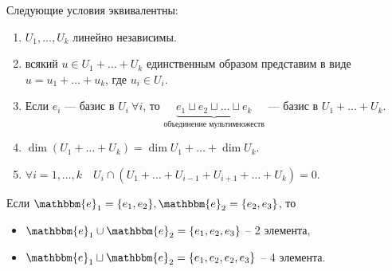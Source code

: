 \begin{theorem}
    Следующие условия эквивалентны:
    \begin{enumerate}[label=(\arabic*)]
    \item \label{lec15:eq_thm_1} $U_1, \dots, U_k$ линейно независимы.
    \item \label{lec15:eq_thm_2} всякий $u \in U_1 + \dots + U_k$ единственным образом представим в виде $u = u_1 + \dots + u_k$, где $u_i \in U_i$.
    \item \label{lec15:eq_thm_3} Если $e_i$ --- базис в $U_i \ \forall i$, то $\underbrace{e_1 \sqcup e_2 \sqcup \dots \sqcup e_k}_\text{объединение мультимножеств}$ --- базис в $U_1 + \dots + U_k$.
    \item \label{lec15:eq_thm_4} $\dim (U_1 + \dots + U_k) = \dim U_1 + \dots + \dim U_k$.
    \item \label{lec15:eq_thm_5} $\forall i = 1, \dots, k \quad U_i \cap (U_1 + \dots + U_{i - 1} + U_{i + 1} + \dots + U_k) = 0$.
    \end{enumerate}
\end{theorem}

\begin{example}
    \newcommand{\E}{\mathbbm{e}}
    Если $\E_1 = \{e_1, e_2\}, \E_2 = \{e_2, e_3\}$, то
    \begin{itemize}[nosep]
    \item $\E_1 \cup \E_2 = \{e_1, e_2, e_3\}$ -- 2 элемента,
    \item $\E_1 \sqcup \E_2 = \{e_1, e_2, e_2, e_3\}$ -- 4 элемента.
    \end{itemize}
\end{example}

